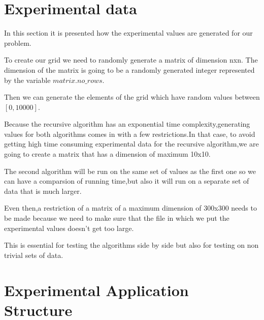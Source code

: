 \documentclass{article}
\begin{document}
\section{Experimental data}
\Large
\vspace*{1cm}
\par In this section it is presented how the experimental values are generated
for our problem.
\par To create our grid we need to randomly generate a matrix of dimension nxn.
     The dimension of the matrix is going to be a randomly generated integer 
     represented by the variable $matrix.no\_rows$.
\par Then we can generate the elements of the grid which have random values
between $[0,10000]$.
\par Because the recursive algorithm has an exponential time complexity,generating
values for both algorithms comes in with a few restrictions.In that case, to avoid
getting high time consuming experimental data for the recursive algorithm,we are going to create a matrix that has a dimension of maximum 10x10.
\par The second algorithm will be run on the same set of values as the first one 
so we can have a comparsion of running time,but also it will run on a separate set
of data that is much larger.
\par Even then,a restriction of a matrix of a maximum dimension of 300x300 needs to be made because we need to make sure that the file in which we put the experimental values doesn't get too large.
\par This is essential for testing the algorithms side by side but also for testing 
on non trivial sets of data.
\newpage
\section{Experimental Application Structure}
\end{document}
